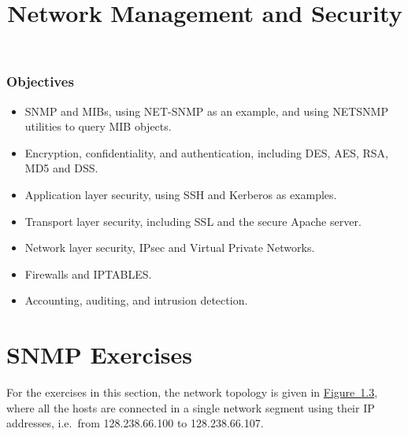 \documentclass{../UTNetLab}
\title{Network Management and Security}
\begin{document}
\section*{Objectives}
\begin{itemize}
    \item SNMP and MIBs, using NET-SNMP as an example, and using NETSNMP utilities to query MIB objects.
    \item Encryption, confidentiality, and authentication, including DES, AES, RSA, MD5 and DSS.
    \item Application layer security, using SSH and Kerberos as examples.
    \item Transport layer security, including SSL and the secure Apache server.
    \item Network layer security, IPsec and Virtual Private Networks.
    \item Firewalls and IPTABLES.
    \item Accounting, auditing, and intrusion detection.
\end{itemize}

\part{SNMP Exercises}
For the exercises in this section, the network topology is given in \hyperref[fig:1.3]{Figure~1.3}, where all the hosts are connected in a single network segment using their IP addresses, i.e.\  from 128.238.66.100 to 128.238.66.107.
\end{document}
